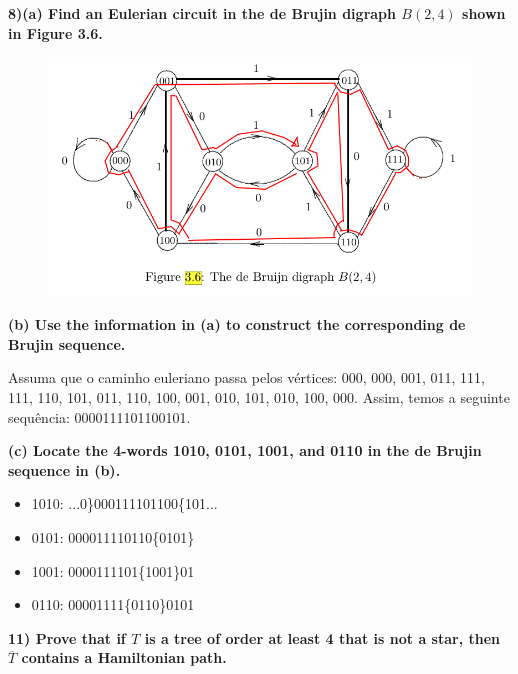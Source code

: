 \documentclass[]{article}
\begin{document}

\newpage

\noindent \textbf{8)(a) Find an Eulerian circuit in the de Brujin digraph $B(2, 4)$ shown in Figure 3.6.}

\begin{figure}[h]
	\begin{center}
		\includegraphics[scale=0.75]{image/brujin.png}
	\end{center}
\end{figure}

\noindent \textbf{(b) Use the information in (a) to construct the corresponding de Brujin sequence.}

Assuma que o caminho euleriano passa pelos vértices: 000, 000, 001, 011, 111, 111, 110, 101, 011, 110, 100, 001, 010, 101, 010, 100, 000. Assim, temos a seguinte sequência: 0000111101100101.

\noindent \textbf{(c) Locate the 4-words 1010, 0101, 1001, and 0110 in the de Brujin sequence in (b).}

\begin{itemize}
    \item 1010: ...0\}000111101100\{101...
    \item 0101: 000011110110\{0101\}
    \item 1001: 0000111101\{1001\}01
    \item 0110: 00001111\{0110\}0101
\end{itemize}

\newpage

\noindent \textbf{11) Prove that if $T$ is a tree of order at least 4 that is not a star, then $\overline{T}$ contains a Hamiltonian path.}
\end{document}
